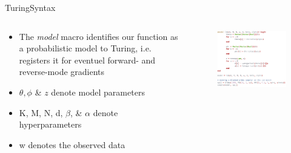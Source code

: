 \documentclass[AERbeamer%
              ,optEnglish%
              ,optBiber%
              ,optBibstyleAlphabetic%
              ,optBeamerClassicFormat%
              ]{AERlatex}%
\begin{document}
\begin{frame}[c]{Turing}{Syntax}
    \centering
    \begin{columns}[T]
        \begin{column}{0.4\textwidth}
            \centering
            \begin{itemize}
                \item The \textit{model} macro identifies our function as a probabilistic model
                      to Turing, i.e. registers it for eventuel forward- and reverse-mode gradients
                \item $\theta, \phi$ \& $z$ denote model parameters
                \item K, M, N, d, $\beta$, \& $\alpha$ denote hyperparameters
                \item w denotes the observed data
            \end{itemize}
        \end{column}
        \begin{column}{0.58\textwidth}
            \centering
            \begin{figure}
                \centering
                \includegraphics[width=\textwidth]{TuringSyntax.png}
            \end{figure}
        \end{column}
    \end{columns}
\end{frame}
\end{document}
